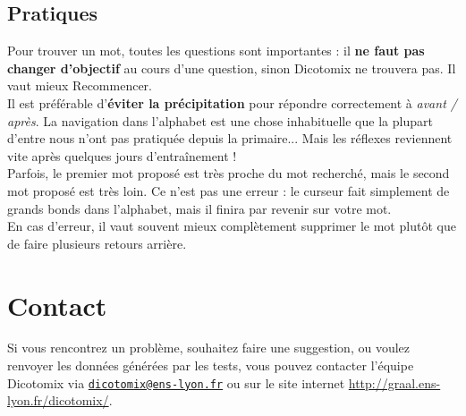 \documentclass[french]{article}
\begin{document}
\subsection{Pratiques}
Pour trouver un mot, toutes les questions sont importantes : il \textbf{ne faut pas changer d'objectif} au cours d'une question, sinon Dicotomix ne trouvera pas. Il vaut mieux Recommencer.
\\

Il est préférable d'\textbf{éviter la précipitation} pour répondre correctement à \emph{avant / après}. La navigation dans l'alphabet est une chose inhabituelle que la plupart d'entre nous n'ont pas pratiquée depuis la primaire... Mais les réflexes reviennent vite après quelques jours d'entraînement !
\\

Parfois, le premier mot proposé est très proche du mot recherché, mais le second mot proposé est très loin. Ce n'est pas une erreur : le curseur fait simplement de grands bonds dans l'alphabet, mais il finira par revenir sur votre mot.
\\

En cas d'erreur, il vaut souvent mieux complètement supprimer le mot plutôt que de faire plusieurs retours arrière.

\section{Contact}
Si vous rencontrez un problème, souhaitez faire une suggestion, ou voulez renvoyer les données générées par les tests, vous pouvez contacter l'équipe Dicotomix via \href{mailto:dicotomix@ens-lyon.fr}{\nolinkurl{dicotomix@ens-lyon.fr}} ou sur le site internet \url{http://graal.ens-lyon.fr/dicotomix/}.
\end{document}
